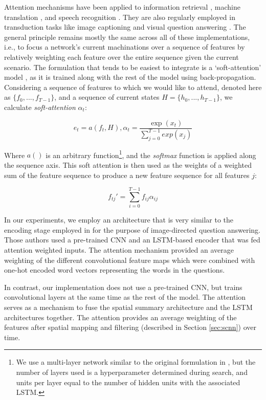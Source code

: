 \documentclass[utf8]{frontiersSCNS} %
\begin{document}
Attention mechanisms have been applied to information retrieval \cite{Moritz}, machine translation \cite{machine_translation}, and speech recognition \cite{Bahdanau}. They are also regularly employed in transduction tasks like image captioning \cite{XuKELVINXU, etc.} and visual question answering \cite{}. The general principle remains mostly the same across all of these implementations, i.e., to focus a network's current machinations over a sequence of features by relatively weighting each feature over the entire sequence given the current scenario. The formulation that tends to be easiest to integrate is a `soft-attention' model \cite{XuKELVINXU}, as it is trained along with the rest of the model using back-propagation. Considering a sequence of features to which we would like to attend, denoted here as $\{f_0, ..., f_{T-1}\}$, and a sequence of current states $H = \{h_0,...,h_{T-1}\}$, we calculate \emph{soft-attention} $\alpha_t$: 

\begin{equation} \label{eq:attn_nrg}
  e_{t} = a(f_{t}, H) , \alpha_t =  \frac{\exp(x_{t})}{\sum_{j=0}^{T-1}exp(x_{j})}
\end{equation}

Where $a()$ is an arbitrary function\footnote{We use a multi-layer network similar to the original formulation in \cite{XuKELVINXU}, but the number of layers used is a hyperparameter determined during search, and units per layer equal to the number of hidden units with the associated LSTM.}, and the \emph{softmax} function is applied along the sequence axis. This soft attention is then used as the weights of a weighted sum of the feature sequence to produce a new feature sequence for all features $j$: 

\begin{equation} \label{eq:attn}
    f_{tj}' = \sum_{i=0}^{T-1} f_{ij} \alpha_{ij}
  \end{equation}

In our experiments, we employ an architecture that is very similar to the encoding stage employed in \cite{Zhu} for the purpose of image-directed question answering. Those authors used a pre-trained CNN and an LSTM-based encoder that was fed attention weighted inputs. The attention mechanism provided an average weighting of the different convolutional feature maps which were combined with one-hot encoded word vectors representing the words in the questions.


In contrast, our implementation does not use a pre-trained CNN, but trains convolutional layers at the same time as the rest of the model. The attention serves as a mechanism to fuse the spatial summary architecture and the LSTM architectures together. The attention provides an average weighting of the features after spatial mapping and filtering (described in Section \ref{sec:scnn}) over time.
\end{document}
